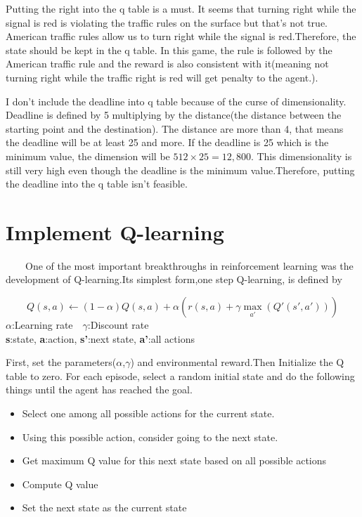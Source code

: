\documentclass[a4paper,11pt]{article}
\begin{document}
Putting the right into the q table is a must. It seems that turning right while the signal is red is violating the traffic rules on the surface but that's not true.
American traffic rules allow us to turn right while the signal is red.Therefore, the state should be kept in the q table. In this game, the rule is followed by the American traffic rule and the reward is also consistent with it(meaning not turning right while the traffic right is red will get penalty to the agent.).


I don't include the deadline into q table because of the curse of dimensionality. Deadline is defined by 5 multiplying by the distance(the distance between the starting point and the destination). The distance are more than 4, that means the deadline will be at least 25 and more. If the deadline is 25 which is the minimum value, the dimension will be $512 \times 25 = 12,800$. This dimensionality is still very high even though the deadline is the minimum value.Therefore, putting the deadline into the q table isn't feasible.


\section{Implement Q-learning}
\ \ \ \ One of the most important breakthroughs in reinforcement learning was the development of Q-learning.Its simplest form,one step Q-learning, is defined by

\begin{equation}
	Q(s,a)\leftarrow (1-\alpha)Q(s,a)+\alpha(r(s,a)+\gamma \max_{a'}(Q'(s',a')))
\end{equation}
$\alpha$:Learning rate　$\gamma$:Discount rate \\
{\bf s}:state, {\bf a}:action, {\bf s'}:next state, {\bf a'}:all actions


First, set the parameters($\alpha$,$\gamma$) and environmental reward.Then Initialize the Q table to zero. For each episode, select a random initial state and do the following things until the agent has reached the goal.
\begin{itemize}
\item Select one among all possible actions for the current state.
\item Using this possible action, consider going to the next state.
\item Get maximum Q value for this next state based on all possible actions
\item Compute Q value
\item Set the next state as the current state
\end{itemize}
\end{document}
